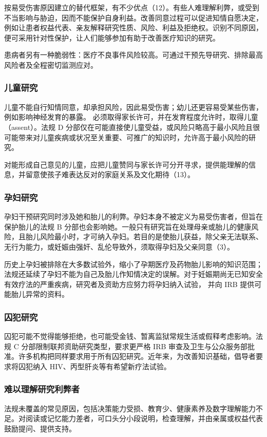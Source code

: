 按易受伤害原因建立的替代框架，有不少优点（12）。有些人难理解利弊，或受到不当影响与胁迫，因而不能保护自身利益。改善同意过程可以促进知情自愿决定，例如让患者权益代表、亲友解释研究性质、风险、利益及拒绝权。识别不同原因，便可采用针对性保护，让人们能够参加有助于改善医疗知识的研究。

患病者另有一种脆弱性：医疗不良事件风险较高。可通过干预先导研究、排除最高风险者及全程密切监测应对。

\subsubsection{儿童研究}
儿童不能自行知情同意，却承担风险，因此易受伤害；幼儿还更容易受某些伤害，例如影响神经发育的暴露。
必须取得家长许可，并在发育程度允许时，取得儿童（assent）。法规 D 分部仅在可能直接使儿童受益，或风险只略高于最小风险且很可能带来对儿童疾病或状况至关重要、可推广的知识时，允许高于最小风险的研究。

对能形成自己意见的儿童，应把儿童赞同与家长许可分开寻求，提供能理解的信息，并留意使孩子难表达反对的家庭关系及文化期待（13）。

\subsubsection{孕妇研究}
孕妇干预研究同时涉及她和胎儿的利弊。孕妇本身不被定义为易受伤害者，但旨在保护胎儿的法规 B 分部也会影响她。一般只有研究旨在处理母亲或胎儿的健康风险，且胎儿风险最小时，才可纳入孕妇。若目的是使胎儿获益，除父亲无法联系、无行为能力，或妊娠由强奸、乱伦导致外，须取得孕妇及父亲同意（3）。

历史上孕妇被排除在大多数试验外，缩小了孕期医疗及药物胎儿影响的知识范围；法规还延续了孕妇不能为自己及胎儿作知情决定的误解。对于妊娠期尚无已知安全有效疗法的严重疾病，研究者及资助方应努力将孕妇纳入试验，
并向 IRB 提供可能胎儿异常的资料。

\subsubsection{囚犯研究}
囚犯可能不觉得能够拒绝，也可能受金钱、暂离监狱常规生活或假释考虑影响。法规 C 分部限制联邦资助研究类型，要求更严格 IRB 审查及卫生与公众服务部批准。许多机构把同样要求用于所有囚犯研究。近年来，为改善知识基础，倡导者要求将囚犯纳入 HIV、丙型肝炎等有希望新疗法试验。

\subsubsection{难以理解研究利弊者}
法规未覆盖的常见原因，包括决策能力受损、教育少、健康素养及数字理解能力不足。对阅读或记忆能力差者，可口头分小段说明，检查理解，并由亲属或权益代表鼓励提问、提供支持。

